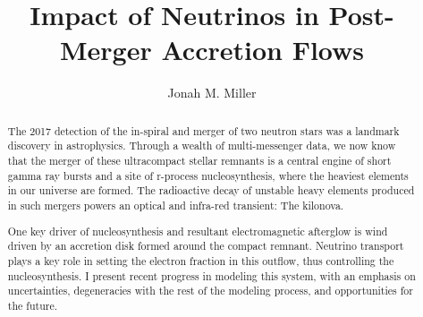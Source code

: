 \documentclass[letter,nofootinbib,superscriptaddress,twocolumn]{revtex4-1}
\begin{document}
\title{Impact of Neutrinos in Post-Merger Accretion Flows}

\author{Jonah M. Miller}

\begin{abstract}

  The 2017 detection of the in-spiral and merger of two neutron stars
  was a landmark discovery in astrophysics. Through a wealth of
  multi-messenger data, we now know that the merger of these
  ultracompact stellar remnants is a central engine of short gamma ray
  bursts and a site of r-process nucleosynthesis, where the heaviest
  elements in our universe are formed. The radioactive decay of
  unstable heavy elements produced in such mergers powers an optical
  and infra-red transient: The kilonova.

  One key driver of nucleosynthesis and resultant electromagnetic
  afterglow is wind driven by an accretion disk formed around the
  compact remnant. Neutrino transport plays a key role in setting the
  electron fraction in this outflow, thus controlling the
  nucleosynthesis. I present recent progress in modeling this system,
  with an emphasis on uncertainties, degeneracies with the rest of the
  modeling process, and opportunities for the future.

\end{abstract}

\maketitle
\end{document}
